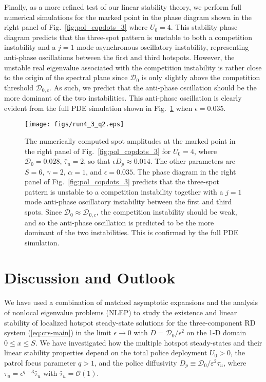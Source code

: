 \documentclass{article}%
\newcommand{\eps}{{\displaystyle \varepsilon}}
\begin{document}
Finally, as a more refined test of our linear stability theory, we
perform full numerical simulations for the marked point in the phase
diagram shown in the right panel of Fig.~\ref{fig:pol_copdots_3} where
$U_0=4$. This stability phase diagram predicts that the three-spot
pattern is unstable to both a competition instability and a $j=1$ mode
asynchronous oscillatory instability, representing anti-phase
oscillations between the first and third hotspots. However, the
unstable real eigenvalue associated with the competition instability
is rather close to the origin of the spectral plane since ${\mathcal
  D}_0$ is only slightly above the competition threshold ${\mathcal
  D}_{0,c}$. As such, we predict that the anti-phase oscillation
should be the more dominant of the two instabilities. This anti-phase
oscillation is clearly evident from the full PDE simulation shown in
Fig.~\ref{fig:valid_cops_on_dots_3_b} when $\epsilon=0.035$.

\begin{figure}[htbp]
\centering
\texttt{[image: figs/run4\_3\_q2.eps]}
\caption{\label{fig:valid_cops_on_dots_3_b} The numerically computed
  spot amplitudes at the marked point in the right panel of
  Fig.~\ref{fig:pol_copdots_3} for $U_0=4$, where ${\mathcal
    D}_0=0.028$, $\hat{\tau}_u=2$, so that $\epsilon D_p\approx
  0.014$. The other parameters are $S=6$, $\gamma=2$, $\alpha=1$, and
  $\epsilon=0.035$. The phase diagram in the right panel of
  Fig.~\ref{fig:pol_copdots_3} predicts that the three-spot pattern is
  unstable to a competition instability together with a $j=1$ mode
  anti-phase oscillatory instability between the first and third
  spots. Since ${\mathcal D}_0\approx {\mathcal D}_{0,c}$, the
  competition instability should be weak, and so the anti-phase
  oscillation is predicted to be the more dominant of the two
  instabilities. This is confirmed by the full PDE simulation.}
\end{figure}
 
\setcounter{equation}{0}
\setcounter{section}{7}
\section{Discussion and Outlook}\label{sec:disc}

We have used a combination of matched asymptotic expansions and the
analysis of nonlocal eigenvalue problems (NLEP) to study the existence
and linear stability of localized hotspot steady-state solutions for
the three-component RD system (\ref{eq:crs-main}) in the limit
$\epsilon\to 0$ with $D={{\mathcal D}_0/\epsilon^2}$ on the 1-D domain
$0\leq x\leq S$. We have investigated how the multiple hotspot
steady-states and their linear stability properties depend on the
total police deployment $U_0>0$, the patrol focus parameter $q>1$, and
the police diffusivity $D_p\equiv {{\mathcal D}_0/\eps^2 \tau_u}$, where
$\tau_u=\epsilon^{q-3}\hat{\tau}_u$ with $\hat{\tau}_u={\mathcal
  O}(1)$.
\end{document}

